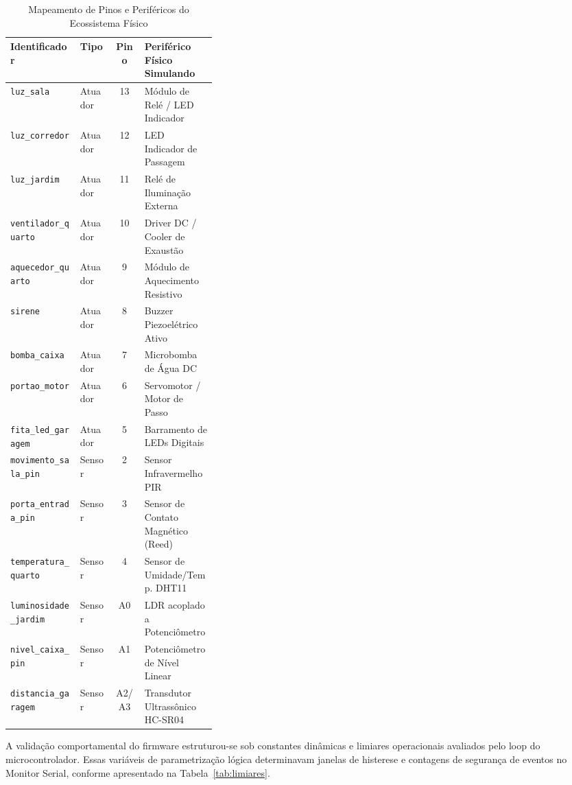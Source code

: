 \documentclass[conference]{IEEEtran}
\begin{document}
\begin{table}[htbp]
\caption{Mapeamento de Pinos e Periféricos do Ecossistema Físico}
\label{tab:hardware_pins}
\centering
\begin{tabular}{llcp{0.35\linewidth}}
\toprule
\textbf{Identificador} & \textbf{Tipo} & \textbf{Pino} & \textbf{Periférico Físico Simulando} \\
\midrule
\texttt{luz\_sala} & Atuador & 13 & Módulo de Relé / LED Indicador \\
\texttt{luz\_corredor} & Atuador & 12 & LED Indicador de Passagem \\
\texttt{luz\_jardim} & Atuador & 11 & Relé de Iluminação Externa \\
\texttt{ventilador\_quarto} & Atuador & 10 & Driver DC / Cooler de Exaustão \\
\texttt{aquecedor\_quarto} & Atuador & 9 & Módulo de Aquecimento Resistivo \\
\texttt{sirene} & Atuador & 8 & Buzzer Piezoelétrico Ativo \\
\texttt{bomba\_caixa} & Atuador & 7 & Microbomba de Água DC \\
\texttt{portao\_motor} & Atuador & 6 & Servomotor / Motor de Passo \\
\texttt{fita\_led\_garagem} & Atuador & 5 & Barramento de LEDs Digitais \\
\texttt{movimento\_sala\_pin} & Sensor & 2 & Sensor Infravermelho PIR \\
\texttt{porta\_entrada\_pin} & Sensor & 3 & Sensor de Contato Magnético (Reed) \\
\texttt{temperatura\_quarto} & Sensor & 4 & Sensor de Umidade/Temp. DHT11 \\
\texttt{luminosidade\_jardim} & Sensor & A0 & LDR acoplado a Potenciômetro \\
\texttt{nivel\_caixa\_pin} & Sensor & A1 & Potenciômetro de Nível Linear \\
\texttt{distancia\_garagem} & Sensor & A2/A3 & Transdutor Ultrassônico HC-SR04 \\
\bottomrule
\end{tabular}
\end{table}

A validação comportamental do firmware estruturou-se sob constantes dinâmicas e limiares operacionais avaliados pelo loop do microcontrolador. Essas variáveis de parametrização lógica determinavam janelas de histerese e contagens de segurança de eventos no Monitor Serial, conforme apresentado na Tabela~\ref{tab:limiares}.
\end{document}
